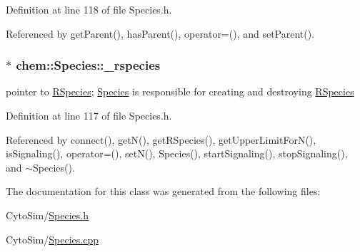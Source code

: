 Definition at line 118 of file Species.\-h.



Referenced by get\-Parent(), has\-Parent(), operator=(), and set\-Parent().

\hypertarget{classchem_1_1Species_aa6a2ec40f6f1b08c76a184d11571c570}{
\subsubsection[{\-\_\-rspecies}]{$\ast$ {\bf chem\-::\-Species\-::\-\_\-rspecies}}}\label{classchem_1_1Species_aa6a2ec40f6f1b08c76a184d11571c570}


pointer to \hyperlink{classchem_1_1RSpecies}{R\-Species}; \hyperlink{classchem_1_1Species}{Species} is responsible for creating and destroying \hyperlink{classchem_1_1RSpecies}{R\-Species} 



Definition at line 117 of file Species.\-h.



Referenced by connect(), get\-N(), get\-R\-Species(), get\-Upper\-Limit\-For\-N(), is\-Signaling(), operator=(), set\-N(), Species(), start\-Signaling(), stop\-Signaling(), and $\sim$\-Species().



The documentation for this class was generated from the following files\-:\begin{DoxyCompactItemize}
\item 
Cyto\-Sim/\hyperlink{Species_8h}{Species.\-h}\item 
Cyto\-Sim/\hyperlink{Species_8cpp}{Species.\-cpp}\end{DoxyCompactItemize}
